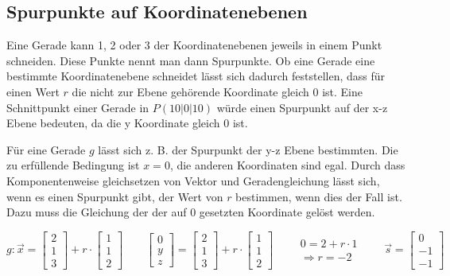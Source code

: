 \subsection{Spurpunkte auf Koordinatenebenen}

Eine Gerade kann 1, 2 oder 3 der Koordinatenebenen jeweils in einem Punkt schneiden.
Diese Punkte nennt man dann Spurpunkte. Ob eine Gerade eine bestimmte Koordinatenebene
schneidet lässt sich dadurch feststellen, dass für einen Wert $r$ die nicht zur Ebene
gehörende Koordinate gleich 0 ist. Eine Schnittpunkt einer Gerade in $P(10 | 0 | 10)$ würde
einen Spurpunkt auf der x-z Ebene bedeuten, da die y Koordinate gleich 0 ist.

\vspace*{0.2cm}

Für eine Gerade $g$ lässt sich z. B. der Spurpunkt der y-z Ebene bestimmten.
Die zu erfüllende Bedingung ist $x = 0$, die anderen Koordinaten sind egal.
Durch dass Komponentenweise gleichsetzen von Vektor und Geradengleichung lässt
sich, wenn es einen Spurpunkt gibt, der Wert von $r$ bestimmen, wenn dies der Fall ist.
Dazu muss die Gleichung der der auf 0 gesetzten Koordinate gelöst werden. 

\begin{equation*}
    g: \vec{x} =
    \begin{bmatrix}
        2 \\
        1 \\
        3
    \end{bmatrix}
    +
    r \cdot
    \begin{bmatrix}
        1 \\
        1 \\
        2
    \end{bmatrix}
    \qquad
    \begin{bmatrix}
        0 \\
        y \\
        z
    \end{bmatrix}
    =
    \begin{bmatrix}
        2 \\
        1 \\
        3
    \end{bmatrix}
    +
    r \cdot
    \begin{bmatrix}
        1 \\
        1 \\
        2
    \end{bmatrix}
    \qquad
    \begin{aligned}
        0 = 2 + r \cdot 1 \\
        \Rightarrow r = -2
    \end{aligned}
    \qquad
    \vec{s} =
    \begin{bmatrix}
        0 \\
        -1 \\
        -1
    \end{bmatrix}
\end{equation*}

